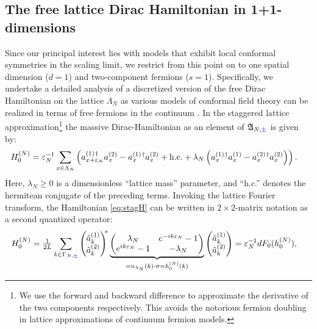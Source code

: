\documentclass[a4paper, 11pt]{article}
\newcommand{\fA}{\mathfrak{A}}\newcommand{\cA}{\mathcal{A}}\newcommand{\dA}{\mathds{A}}\newcommand{\sA}{\mathscr{A}}
\DeclareMathOperator{\1}{\mathds{1}}
\begin{document}
\subsection{The free lattice Dirac Hamiltonian in 1+1-dimensions}
\label{sec:latdirac}
Since our principal interest lies with models that exhibit local conformal symmetries in the scaling limit, we restrict from this point on to one spatial dimension ($d=1$) and two-component fermions ($s=1$). Specifically, we undertake a detailed analysis of a discretized version of the free Dirac Hamiltonian on the lattice $\Lambda_{N}$ as various models of conformal field theory can be realized in terms of free fermions in the continuum \cite{DiFrancescoCFTBook, EvansQuantumSymmetriesOn, XuSomeResultsOn, WassermannOperatorAlgebrasAnd}. In the staggered lattice approximation\footnote{We use the forward and backward difference to approximate the derivative of the two components respectively. This avoids the notorious fermion doubling in lattice approximations of continuum fermion models.} \cite{SusskindLatticeFermions} the massive Dirac-Hamiltonian as an element of $\fA_{N,{\color{blue}\pm}}$ is given by:
\begin{align}
\label{eq:stagH}
H^{(N)}_{0} & = \vep_{N}^{-1}\sum_{x\in\Lambda_{N}}\left(a^{(1)\!\!\ \dagger}_{x+\vep_{N}}a^{(2)}_{x} - a^{(1)\!\!\ \dagger}_{x}a^{(2)}_{x} + \textup{h.c.} + \lambda_{N}\left(a^{(1)\!\!\ \dagger}_{x}a^{(1)}_{x} - a^{(2)\!\!\ \dagger}_{x}a^{(2)}_{x}\right)\right).
\end{align}
Here, $\lambda_{N}\geq0$ is a dimensionless ``lattice mass'' parameter, and ``h.c.'' denotes the hermitean conjugate of the preceding terms. Invoking the lattice Fourier transform, the Hamiltonian \eqref{eq:stagH} can be written in $2\times 2$-matrix notation as a second quantized operator:
\begin{align}
\label{eq:FstagH}
H^{(N)}_{0} & = \tfrac{1}{2L}\sum_{k\in\Gamma_{N,{\color{blue}\pm}}}\begin{pmatrix} \hat{a}^{(1)}_{k} \\ \hat{a}^{(2)}_{k} \end{pmatrix}^{\!\!*} \underbrace{\begin{pmatrix} \lambda_{N} & e^{-ik\varepsilon_{N}}-1 \\ e^{ik\varepsilon_{N}}-1 & -\lambda_{N} \end{pmatrix}}_{= n_{\lambda_{N}}(k)\cdot\sigma = h^{(N)}_{0}(k)} \begin{pmatrix} \hat{a}^{(1)}_{k} \\ \hat{a}^{(2)}_{k} \end{pmatrix} = \varepsilon_{N}^{-1}dF_{0}(h^{(N)}_{0}),
\end{align}
\end{document}
